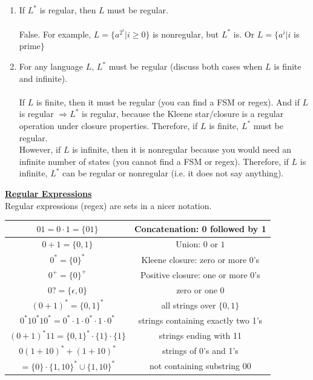 \documentclass[8pt,letterpaper,twocolumn]{article}
\begin{document}
  \begin{enumerate}
  \item If $L^*$ is regular, then $L$ must be regular.\\
  \\
  False. For example, $L = \{a^{2^i} | i \geq 0\}$ is nonregular, but $L^*$ is.
  Or $L = \{a^i | i$ is prime$\}$
  
  \item For any language $L$, $L^*$ must be regular
  (discuss both cases when $L$ is finite and infinite).\\
  \\
  If $L$ is finite, then it must be regular (you can find a FSM or regex).
  And if $L$ is regular $\Rightarrow L^*$ is regular, because
  the Kleene star/closure is a regular operation under closure properties.
  Therefore, if $L$ is finite, $L^*$ must be regular.\\
  However, if $L$ is infinite, then it is nonregular because you would need an
  infinite number of states (you cannot find a FSM or regex).
  Therefore, if $L$ is infinite, $L^*$ can be regular or nonregular (i.e. it does not say anything).
  \end{enumerate}
\underline{\textbf{Regular Expressions}}\\
Regular expressions (regex) are sets in a nicer notation.
\begin{tabular}{|c|c|}
\hline
$01 = 0 \cdot 1 = \{01\}$ & Concatenation: 0 followed by 1\\
\hline 
$0+1 = \{0,1\}$ & Union: $0$ or $1$\\ 
\hline 
$0^* = \{0\}^*$ & Kleene closure: zero or more 0's\\ 
\hline
$0^+ = \{0\}^+$ & Positive closure: one or more 0's\\
\hline
$0? = \{\epsilon, 0\}$ & zero or one 0\\
\hline
$(0+1)^* = \{0,1\}^*$ &  all strings over $\{0,1\}$\\
\hline
$0^*10^*10^* = 0^* \cdot 1 \cdot 0^* \cdot 1 \cdot 0^*$ & strings containing exactly two 1's\\
\hline
$(0+1)^*11 = \{0,1\}^*\cdot \{1\} \cdot \{1\}$ & strings ending with 11\\
\hline
$0(1+10)^*+(1+10)^* $ & strings of 0's and 1's \\
$= \{0\} \cdot \{1,10\}^* \cup \{1,10\}^*$ & not containing substring 00\\
\hline
\end{tabular} 
\end{document}
